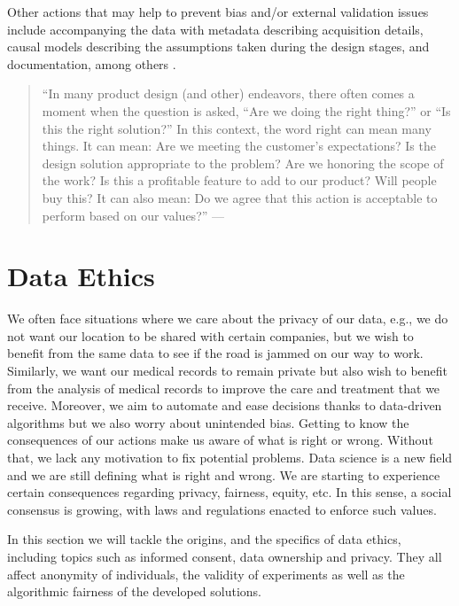 \documentclass[
]{book}
\begin{document}
Other actions that may help to prevent bias and/or external validation issues include accompanying the data with metadata describing acquisition details, causal models describing the assumptions taken during the design stages, and documentation, among others \citep{garcia2021need}.

\begin{quote}
``In many product design (and other) endeavors, there often comes a moment when the question is asked, ``Are we doing the right thing?'' or ``Is this the right solution?'' In this context, the word right can mean many things. It can mean: Are we meeting the customer's expectations? Is the design solution appropriate to the problem? Are we honoring the scope of the work? Is this a profitable feature to add to our product? Will people buy this? It can also mean: Do we agree that this action is acceptable to perform based on our values?'' --- \citep{davis2012ethics}
\end{quote}

\hypertarget{data-ethics}{%
\section{Data Ethics}\label{data-ethics}}

We often face situations where we care about the privacy of our data, e.g., we do not want our location to be shared with certain companies, but we wish to benefit from the same data to see if the road is jammed on our way to work. Similarly, we want our medical records to remain private but also wish to benefit from the analysis of medical records to improve the care and treatment that we receive. Moreover, we aim to automate and ease decisions thanks to data-driven algorithms but we also worry about unintended bias. Getting to know the consequences of our actions make us aware of what is right or wrong. Without that, we lack any motivation to fix potential problems. Data science is a new field and we are still defining what is right and wrong. We are starting to experience certain consequences regarding privacy, fairness, equity, etc. In this sense, a social consensus is growing, with laws and regulations enacted to enforce such values.

In this section we will tackle the origins, and the specifics of data ethics, including topics such as informed consent, data ownership and privacy. They all affect anonymity of individuals, the validity of experiments as well as the algorithmic fairness of the developed solutions.
\end{document}

